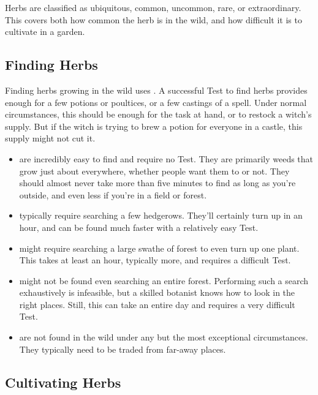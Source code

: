 Herbs are classified as ubiquitous, common, uncommon, rare, or extraordinary.
This covers both how common the herb is in the wild, and how difficult it is to cultivate in a garden.

\subsection{Finding Herbs}

Finding herbs growing in the wild uses .
A successful Test to find herbs provides enough for a few potions or poultices, or a few castings of a spell.
Under normal circumstances, this should be enough for the task at hand, or to restock a witch's supply.
But if the witch is trying to brew a potion for everyone in a castle, this supply might not cut it.

\begin{itemize}
	\item
		 are incredibly easy to find and require no Test.
		They are primarily weeds that grow just about everywhere, whether people want them to or not.
		They should almost never take more than five minutes to find as long as you're outside, and even less if you're in a field or forest.
	\item
		 typically require searching a few hedgerows.
		They'll certainly turn up in an hour, and can be found much faster with a relatively easy Test.
	\item
		 might require searching a large swathe of forest to even turn up one plant.
		This takes at least an hour, typically more, and requires a difficult Test.
	\item
		 might not be found even searching an entire forest.
		Performing such a search exhaustively is infeasible, but a skilled botanist knows how to look in the right places.
		Still, this can take an entire day and requires a very difficult Test.
	\item
		 are not found in the wild under any but the most exceptional circumstances.
		They typically need to be traded from far-away places.
\end{itemize}

\subsection{Cultivating Herbs}

